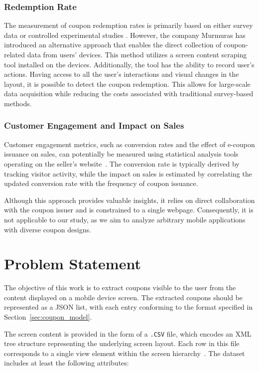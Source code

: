 \documentclass[licencjacka,en]{pracamgr}
\begin{document}
\subsubsection{Redemption Rate}
The measurement of coupon redemption rates is primarily based on either survey data \cite{nayal2021} or controlled experimental studies \cite{danaher2015}. However, the company Murmuras \cite{murmuras} has introduced an alternative approach that enables the direct collection of coupon-related data from users' devices. This method utilizes a screen content scraping tool installed on the devices. Additionally, the tool has the ability to record user's actions.  Having access to all the user's interactions and visual changes in the layout, it is possible to detect the coupon redemption. This allows for large-scale data acquisition while reducing the costs associated with traditional survey-based methods.

\subsubsection{Customer Engagement and Impact on Sales}

Customer engagement metrics, such as conversion rates and the effect of e-coupon issuance on sales, can potentially be measured using statistical analysis tools operating on the seller's website~\cite{seo2023}. The conversion rate is typically derived by tracking visitor activity, while the impact on sales is estimated by correlating the updated conversion rate with the frequency of coupon issuance.

Although this approach provides valuable insights, it relies on direct collaboration with the coupon issuer and is constrained to a single webpage. Consequently, it is not applicable to our study, as we aim to analyze arbitrary mobile applications with diverse coupon designs.

\section{Problem Statement}

The objective of this work is to extract coupons visible to the user from the content displayed on a mobile device screen. The extracted coupons should be represented as a JSON list, with each entry conforming to the format specified in Section~\ref{sec:coupon_model}.

The screen content is provided in the form of a \texttt{.CSV} file, which encodes an XML tree structure representing the underlying screen layout. Each row in this file corresponds to a single view element within the screen hierarchy~\cite{android_view}. The dataset includes at least the following attributes:
\end{document}
